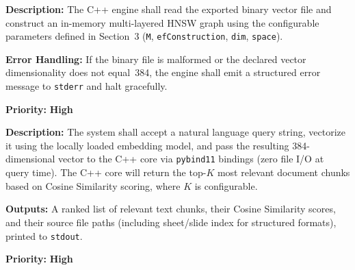 \documentclass[12pt, a4paper]{article}
\begin{document}
\begin{tcolorbox}[enhanced, colback=white, colframe=ctPurple,
    colbacktitle=ctLightPurple, coltitle=ctPurple, boxrule=0.5pt,
    leftrule=4pt, arc=2mm, fonttitle=\large\bfseries,
    title={FR-5: HNSW Graph Construction},
    drop fuzzy shadow=black!5!white, top=2pt, bottom=2pt]
\begin{prolist}
    \item \textbf{Description:} The C++ engine shall read the exported
    binary vector file and construct an in-memory multi-layered HNSW graph
    using the configurable parameters defined in Section~3
    (\texttt{M}, \texttt{efConstruction}, \texttt{dim}, \texttt{space}).

    \item \textbf{Error Handling:} If the binary file is malformed or the
    declared vector dimensionality does not equal~384, the engine shall emit
    a structured error message to \texttt{stderr} and halt gracefully.

    \item \textbf{Priority:} \textcolor{alertRed}{\textbf{High}}
\end{prolist}
\end{tcolorbox}

\vspace{0.4cm}

\begin{tcolorbox}[enhanced, colback=white, colframe=ctPurple,
    colbacktitle=ctLightPurple, coltitle=ctPurple, boxrule=0.5pt,
    leftrule=4pt, arc=2mm, fonttitle=\large\bfseries,
    title={FR-6: Semantic Query Execution},
    drop fuzzy shadow=black!5!white, top=2pt, bottom=2pt]
\begin{prolist}
    \item \textbf{Description:} The system shall accept a natural language
    query string, vectorize it using the locally loaded embedding model, and
    pass the resulting 384-dimensional vector to the C++ core via
    \texttt{pybind11} bindings (zero file I/O at query time). The C++ core
    will return the top-$K$ most relevant document chunks based on Cosine
    Similarity scoring, where $K$ is configurable.

    \item \textbf{Outputs:} A ranked list of relevant text chunks, their
    Cosine Similarity scores, and their source file paths (including
    sheet/slide index for structured formats), printed to \texttt{stdout}.

    \item \textbf{Priority:} \textcolor{alertRed}{\textbf{High}}
\end{prolist}
\end{tcolorbox}
\end{document}
